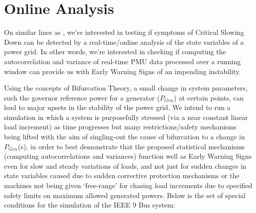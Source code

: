 \section[Online/Real-time Analysis]{Online Analysis}
\label{sec:online}

On similar lines as \cite{ghanvati01, sanchez01}, we're interested in testing if symptoms of Critical Slowing Down can be detected by a real-time/online analysis of the state variables of a power grid. In other words, we're interested in checking if computing the autocorrelation and variance of real-time PMU data processed over a running window can provide us with Early Warning Signs of an impending instability.

Using the concepts of Bifurcation Theory, a small change in system parameters, such the governor reference power for a generator ($P_{Gen}$) at certain points, can lead to major upsets in the stability of the power grid. We intend to run a simulation in which a system is purposefully stressed (via a near constant linear load increment) as time progresses but many restrictions/safety mechanisms being lifted with the aim of singling-out the cause of bifurcation to a change in $P_{Gen}$(s), in order to best demonstrate that the proposed statistical mechanisms (computing autocorrelations and variances) function well as Early Warning Signs even for slow and steady variations of loads, and not just for sudden changes in state variables caused due to sudden corrective protection mechanisms or the machines not being given `free-range' for chasing load increments due to specified safety limits on maximum allowed generated powers. Below is the set of special conditions for the simulation of the IEEE 9 Bus system:


